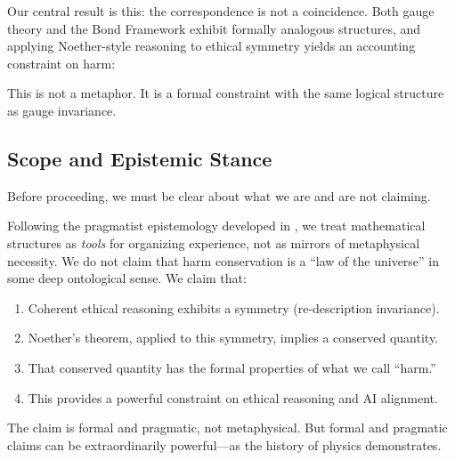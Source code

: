 \documentclass[12pt,letterpaper]{article}
\theoremstyle{definition}
\theoremstyle{remark}
\begin{document}
Our central result is this: the correspondence is not a coincidence. Both gauge theory and the Bond Framework exhibit formally analogous structures, and applying Noether-style reasoning to ethical symmetry yields an accounting constraint on harm:

\begin{center}
\end{center}

This is not a metaphor. It is a formal constraint with the same logical structure as gauge invariance.

\subsection{Scope and Epistemic Stance}

Before proceeding, we must be clear about what we are and are not claiming.

Following the pragmatist epistemology developed in \cite{bond2025pragmatist}, we treat mathematical structures as \textit{tools} for organizing experience, not as mirrors of metaphysical necessity. We do not claim that harm conservation is a ``law of the universe'' in some deep ontological sense. We claim that:

\begin{enumerate}
    \item Coherent ethical reasoning exhibits a symmetry (re-description invariance).
    \item Noether's theorem, applied to this symmetry, implies a conserved quantity.
    \item That conserved quantity has the formal properties of what we call ``harm.''
    \item This provides a powerful constraint on ethical reasoning and AI alignment.
\end{enumerate}

The claim is formal and pragmatic, not metaphysical. But formal and pragmatic claims can be extraordinarily powerful---as the history of physics demonstrates.
\end{document}
